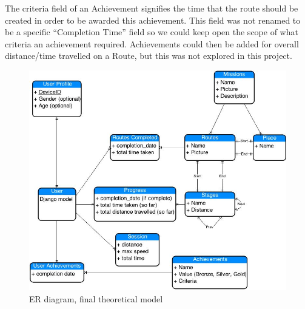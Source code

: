 The criteria field of an Achievement signifies the time that the route
should be created in order to be awarded this achievement. This field
was not renamed to be a specific ``Completion Time'' field so we could
keep open the scope of what criteria an achievement
required. Achievements could then be added for overall distance/time
travelled on a Route, but this was not explored in this project.

\begin{figure}[p]
  \centering
  \includegraphics[width=\textwidth]{images/ER.jpg}
  \caption{ER diagram, final theoretical model}
  \label{ER_1}
\end{figure}

